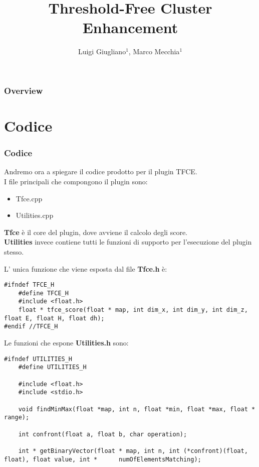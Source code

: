 \documentclass{beamer}
\title{Threshold-Free Cluster Enhancement}
\author{Luigi Giugliano$^1$, Marco Mecchia$^1$}
\institute{$^1$Università degli studi di Salerno}
\begin{document}
\begin{frame}
   \maketitle
\end{frame}

\begin{frame}
  \frametitle{Overview}
  \footnotesize \tableofcontents
\end{frame}



\section{Codice}
\begin{frame}
\frametitle{Codice}
Andremo ora a spiegare il codice prodotto  per il plugin TFCE.\\
\medskip
I file principali che compongono il plugin sono:
\begin{itemize}
\item{Tfce.cpp}
\item{Utilities.cpp}
\end{itemize}
\textbf{Tfce} è il core del plugin, dove avviene il  calcolo degli score.\\
\smallskip
\textbf{Utilities} invece contiene tutti le funzioni di supporto per l'esecuzione del plugin stesso.
\end{frame}

\begin{frame}[fragile]
L' unica funzione che viene esposta dal file \textbf{Tfce.h} è:
\begin{center}
\begin{lstlisting}
#ifndef TFCE_H
    #define TFCE_H
    #include <float.h>
    float * tfce_score(float * map, int dim_x, int dim_y, int dim_z, float E, float H, float dh);
#endif //TFCE_H
\end{lstlisting}
\end{center}
\end{frame}

\begin{frame}[fragile]
Le funzioni che espone \textbf{Utilities.h} sono:
\begin{center}
\begin{lstlisting}
#ifndef UTILITIES_H
    #define UTILITIES_H

    #include <float.h>
    #include <stdio.h>

    void findMinMax(float *map, int n, float *min, float *max, float * range);

    int confront(float a, float b, char operation);

    int * getBinaryVector(float * map, int n, int (*confront)(float, float), float value, int *      numOfElementsMatching);
\end{lstlisting}
\end{center}
\end{frame}
\end{document}

